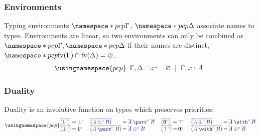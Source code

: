 \documentclass[main.tex]{subfiles}
\begin{document}
\subsubsection*{Environments}
Typing environments $\pcp{\ty{\Gamma}}$, $\pcp{\ty{\Delta}}$ associate names to types. Environments are linear, so two environments can only be combined as $\pcp{\ty{\Gamma}}, \pcp{\ty{\Delta}}$ if their names are distinct, \ie $\pcp{\fv(\ty{\Gamma})\cap\fv(\ty{\Delta})=\varnothing}$.
\[
  \usingnamespace{pcp}
  \begin{array}{lcl}
    \ty{\Gamma}, \ty{\Delta}
    & \Coloneqq & \ty{\emptyenv}
      \sep        \ty{\Gamma}, \tmty{x}{A}
  \end{array}
\]

\subsubsection*{Duality}
Duality is an involutive function on types which preserves priorities:
\[
  \usingnamespace{pcp}
  \setlength{\arraycolsep}{1pt}
  \begin{array}{lcl}
    \ty{\co{(\tyone[\cs{o}])}} & = & \ty{\tybot[\cs{o}]} \\
    \ty{\co{(\tybot[\cs{o}])}} & = & \ty{\tyone[\cs{o}]}
  \end{array}
  \quad
  \begin{array}{lcl}
    \ty{\co{(\tytens[\cs{o}]{A}{B})}} & = & \ty{\typarr[\cs{o}]{\co{A}}{\co{B}}} \\
    \ty{\co{(\typarr[\cs{o}]{A}{B})}} & = & \ty{\tytens[\cs{o}]{\co{A}}{\co{B}}}
  \end{array}
  \quad
  \begin{array}{lcl}
    \ty{\co{(\tynil[\cs{o}])}} & = & \ty{\tytop[\cs{o}]} \\
    \ty{\co{(\tytop[\cs{o}])}} & = & \ty{\tynil[\cs{o}]}
  \end{array}
  \quad
  \begin{array}{lcl}
    \ty{\co{(\typlus[\cs{o}]{A}{B})}} & = & \ty{\tywith[\cs{o}]{\co{A}}{\co{B}}} \\
    \ty{\co{(\tywith[\cs{o}]{A}{B})}} & = & \ty{\typlus[\cs{o}]{\co{A}}{\co{B}}}
  \end{array}
\]
\end{document}
